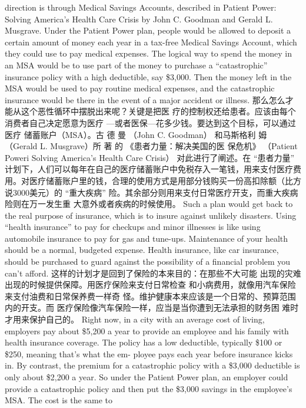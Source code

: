 \begin{paracol}{2}
direction is through Medical Savings Accounts, described in
Patient Power: Solving America's Health Care Crisis by John C.
Goodman and Gerald L. Musgrave. Under the Patient Power
plan, people would be allowed to deposit a certain amount of
money each year in a tax-free Medical Savings Account, which
they could use to pay medical expenses. The logical way to
spend the money in an MSA would be to use part of the
money to purchase a ``catastrophic'' insurance policy with a
high deductible, say \$3,000. Then the money left in the MSA
would be used to pay routine medical expenses, and the catastrophic insurance would be there in the event of a major accident or illness.
\switchcolumn
那么怎么才能从这个恶性循环中摆脱出来呢？关键是把医
疗的控制权还给患者。应该由每个消费者自己决定愿意为医疗
---或者医保---花多少钱。要达到这个目标，可以通过医疗
储蓄账户（MSA）。古 德 曼 （John  C. Goodman） 和马斯格利
姆 （Gerald  L. Musgrave）所 著 的 《患者力量：解决美国的医
保危机》 （Patient Poweri Solving America’s Health Care Cri­sis） 对此进行了阐述。在 “患者力量” 计划下，人们可以每年在自己的医疗储蓄账户中免税存入一笔钱，用来支付医疗费用。对医疗储蓄账户里的钱，合理的使用方式是用部分钱购买一份高扣除额（比方说3000美元）的 “重大疾病” 险。其余部分则用来支付日常医疗开支，而重大疾病险则在万一发生重
大意外或者疾病的时候使用。
\switchcolumn*
Such a plan would get back to the real purpose of insurance,
which is to insure against unlikely disasters. Using ``health insurance'' to pay for checkups and minor illnesses is like using
automobile insurance to pay for gas and tune-ups. Maintenance
of your health should be a normal, budgeted expense. Health
insurance, like car insurance, should be purchased to guard
against the possibility of a financial problem you can't afford.
\switchcolumn
这样的计划才是回到了保险的本来目的：在那些不大可能
出现的灾难出现的时候提供保障。用医疗保险来支付日常检查
和小病费用，就像用汽车保险来支付油费和日常保养费一样奇
怪。维护健康本来应该是一个日常的、预算范围内的开支。而
医疗保险像汽车保险一样，应当是当你遭到无法承担的财务困
难时才用来保护自己的。
\switchcolumn*
Right now, in a city with an average cost of living, employers
pay about \$5,200 a year to provide an employee and his family
with health insurance coverage. The policy has a low deductible, typically \$100 or \$250, meaning that's what the em-
ployee pays each year before insurance kicks in. By contrast, the
premium for a catastrophic policy with a \$3,000 deductible is
only about \$2,200 a year. So under the Patient Power plan, an
employer could provide a catastrophic policy and then put the
\$3,000 savings in the employee's MSA. The cost is the same to

\end{paracol}
